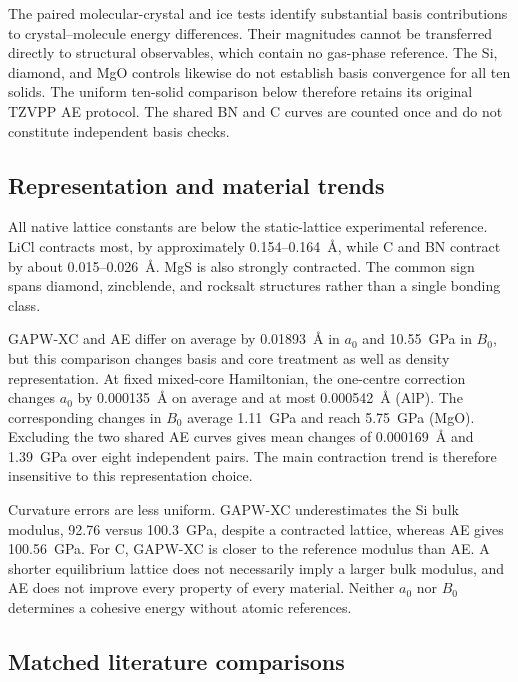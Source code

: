 

The paired molecular-crystal and ice tests identify substantial basis contributions to crystal--molecule energy differences. Their magnitudes cannot be transferred directly to structural observables, which contain no gas-phase reference. The Si, diamond, and MgO controls likewise do not establish basis convergence for all ten solids. The uniform ten-solid comparison below therefore retains its original TZVPP AE protocol. The shared BN and C curves are counted once and do not constitute independent basis checks.

\subsection{Representation and material trends}
\label{sec:solid-trends}

All native lattice constants are below the static-lattice experimental reference. LiCl contracts most, by approximately 0.154--0.164~\AA{}, while C and BN contract by about 0.015--0.026~\AA{}. MgS is also strongly contracted. The common sign spans diamond, zincblende, and rocksalt structures rather than a single bonding class.

GAPW-XC and AE differ on average by 0.01893~\AA{} in $a_0$ and 10.55~GPa in $B_0$, but this comparison changes basis and core treatment as well as density representation. At fixed mixed-core Hamiltonian, the one-centre correction changes $a_0$ by 0.000135~\AA{} on average and at most 0.000542~\AA{} (AlP). The corresponding changes in $B_0$ average 1.11~GPa and reach 5.75~GPa (MgO). Excluding the two shared AE curves gives mean changes of 0.000169~\AA{} and 1.39~GPa over eight independent pairs. The main contraction trend is therefore insensitive to this representation choice.

Curvature errors are less uniform. GAPW-XC underestimates the Si bulk modulus, 92.76 versus 100.3~GPa, despite a contracted lattice, whereas AE gives 100.56~GPa. For C, GAPW-XC is closer to the reference modulus than AE. A shorter equilibrium lattice does not necessarily imply a larger bulk modulus, and AE does not improve every property of every material. Neither $a_0$ nor $B_0$ determines a cohesive energy without atomic references.

\subsection{Matched literature comparisons}
\label{sec:solid-literature}

